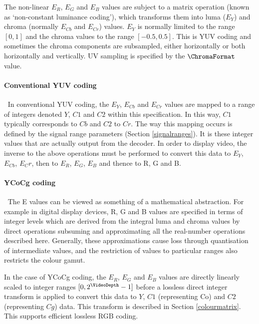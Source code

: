 \begin{informative*}
The non-linear $E_R$, $E_G$ and $E_B$ values are subject to a matrix operation
(known as `non-constant luminance coding'), which transforms
them into luma ($E_Y$) and chroma (normally $E_{Cb}$ and $E_{Cr}$) values. 
$E_Y$ is normally limited to the 
range $[0,1]$ and the chroma
values to the range $[-0.5, 0.5]$. This is YUV coding and
sometimes the chroma components are subsampled, either horizontally or
both horizontally and vertically. UV sampling is specified by the
$\ChromaFormat$ value. 

\paragraph{Conventional YUV coding}
$\ $\newline
In conventional YUV coding, the $E_Y$, $E_{Cb}$ and $E_{Cr}$ values are
mapped to a range of integers denoted $Y$, $C1$ and $C2$ within this
specification. In this way, $C1$ typically corresponds to $Cb$ and
$C2$ to $Cr$. The way this mapping occurs is defined by the signal
range parameters (Section \ref{signalranges}). It is these integer values 
that are actually output from the decoder. In order to display video, the inverse to the above
operations must be performed to convert this data to $E_Y$, $E_{Cb}$, $E_Cr$, then
to $E_R$, $E_G$, $E_B$ and thence to R, G and B.  

\paragraph{YCoCg coding}
$\ $\newline
The E values can be viewed as something of a mathematical abstraction.
For example in digital display devices, R, G and B values are specified
in terms of integer levels which are derived from the integral luma and
chroma values by direct operations subsuming and approximating all the
real-number operations described here. Generally, these approximations
cause loss through quantisation of intermediate values, and the
restriction of values to particular ranges also restricts the colour
gamut. 

In the case of YCoCg coding, the $E_R$, $E_G$ and $E_B$ values are directly
linearly scaled to integer ranges $[0,2^\VideoDepth-1]$ before a lossless 
direct integer transform is applied to convert this data to $Y$, $C1$ (representing
Co) and $C2$ (representing $Cg$) data. This transform is described in Section
\ref{colourmatrix}. This supports efficient lossless RGB coding.


\end{informative*}
